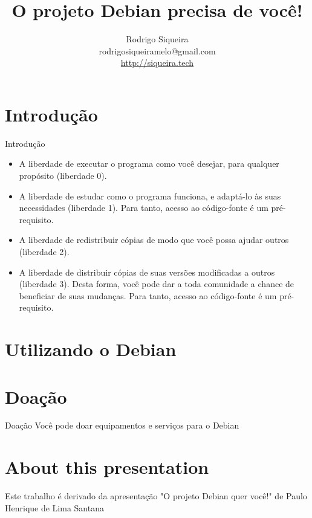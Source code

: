 \documentclass[10pt, compress, aspectratio=169]{beamer}
\title{O projeto Debian precisa de você!}
\author{\footnotesize Rodrigo Siqueira \\ {\scriptsize rodrigosiqueiramelo@gmail.com} \\ {\scriptsize \url{http://siqueira.tech}} }
\institute{\texttt{[image: debian]}\\[0.2cm]}
\begin{document}
\maketitle

\section{Introdução}
\begin{frame}{Introdução}
  \begin{itemize}
    \item A liberdade de executar o programa como você desejar, para qualquer
          propósito (liberdade 0).
    \item A liberdade de estudar como o programa funciona, e adaptá-lo às suas
          necessidades (liberdade 1). Para tanto, acesso ao código-fonte é um
          pré-requisito.
    \item A liberdade de redistribuir cópias de modo que você possa ajudar
          outros (liberdade 2).
    \item A liberdade de distribuir cópias de suas versões modificadas a outros
          (liberdade 3). Desta forma, você pode dar a toda comunidade a chance
          de beneficiar de suas mudanças. Para tanto, acesso ao código-fonte é
          um pré-requisito.

  \end{itemize}
\end{frame}

\section{Utilizando o Debian}


\section{Doação}

\begin{frame}{Doação}
  Você pode doar equipamentos e serviços para o Debian
\end{frame}

\section{About this presentation}
\begin{frame}[standout]
    Este trabalho é derivado da apresentação "O projeto Debian quer você!" de
    Paulo Henrique de Lima Santana
   \begin{center}\ccbysa\end{center}
\end{frame}

\maketitle
\end{document}
